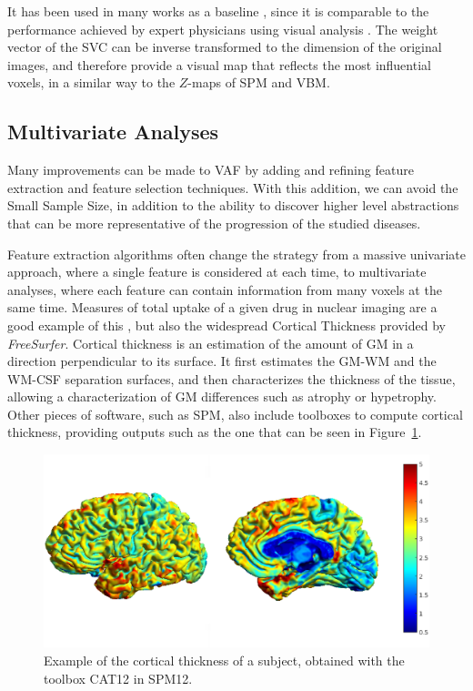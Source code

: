It has been used in many works as a baseline \cite{Spetsieris2009,Salas-Gonzalez2009,Martinez-Murcia2016}, since it is comparable to the performance achieved by expert physicians using visual analysis \cite{Stoeckel04}. The weight vector of the \ac{SVC} can be inverse transformed to the dimension of the original images, and therefore provide a visual map that reflects the most influential voxels, in a similar way to the $Z$-maps of \ac{SPM} and \ac{VBM}. 

\subsection{Multivariate Analyses}
Many improvements can be made to \ac{VAF} by adding and refining feature extraction and feature selection techniques. With this addition, we can avoid the Small Sample Size, in addition to the ability to discover higher level abstractions that can be more representative of the progression of the studied diseases. 

Feature extraction algorithms often change the strategy from a massive univariate approach, where a single feature is considered at each time, to multivariate analyses, where each feature can contain information from many voxels at the same time. Measures of total uptake of a given drug in nuclear imaging are a good example of this \cite{Zhou2007,Lozano2007}, but also the widespread Cortical Thickness \cite{Dale1999} provided by \textit{FreeSurfer}. Cortical thickness is an estimation of the amount of \ac{GM} in a direction perpendicular to its surface. It first estimates the \ac{GM}-\ac{WM} and the \ac{WM}-\ac{CSF} separation surfaces, and then characterizes the thickness of the tissue, allowing a characterization of \ac{GM} differences such as atrophy or hypetrophy. Other pieces of software, such as \ac{SPM}, also include toolboxes to compute cortical thickness, providing outputs such as the one that can be seen in Figure~\ref{fig:corticalthickness}. 

\begin{figure}
\centering
\includegraphics[width=0.8\linewidth]{Graphics/ch2/corticalThickness}
\caption[Example of the cortical thickness of a subject.]{Example of the cortical thickness of a subject, obtained with the toolbox CAT12 in SPM12.}
\label{fig:corticalthickness}
\end{figure}

